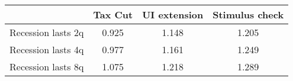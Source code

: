 \begin{tabular}{@{}lccc@{}} 
\toprule 
& Tax Cut    & UI extension    & Stimulus check    \\  \midrule 
Recession lasts 2q &0.925  & 1.148  & 1.205     \\ 
Recession lasts 4q &0.977  & 1.161  & 1.249     \\ 
Recession lasts 8q &1.075  & 1.218  & 1.289     \\ 
\end{tabular}  
